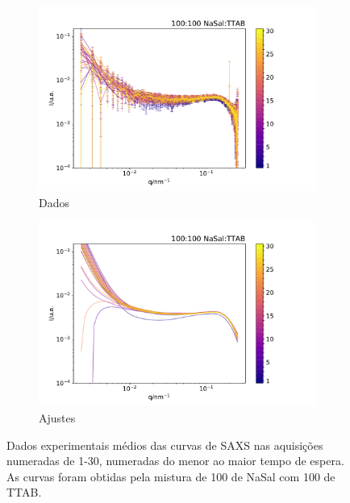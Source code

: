 	\begin{figure}[h]
		\begin{subfigure}[t]{0.5\textwidth}
			\centering
			\includegraphics[width=\textwidth]{imagens/saxs/TR_saxs_100_100_dados.pdf}
			\caption{Dados}
			\label{fig:saxs_tr_100_d}
		\end{subfigure}%
		\begin{subfigure}[t]{0.5\textwidth}
			\centering
			\includegraphics[width=\textwidth]{imagens/saxs/TR_saxs_100_100_ajustes.pdf}
			\caption{Ajustes}
			\label{fig:saxs_tr_100_a}
		\end{subfigure}
		\caption{Dados experimentais médios das curvas de SAXS nas aquisições numeradas de 1-30, numeradas do menor ao maior tempo de espera. As curvas foram obtidas pela mistura de 100 \mM{} de NaSal com 100 \mM{} de TTAB.}
		\label{fig:saxs_tr_100}
	\end{figure} 
	

